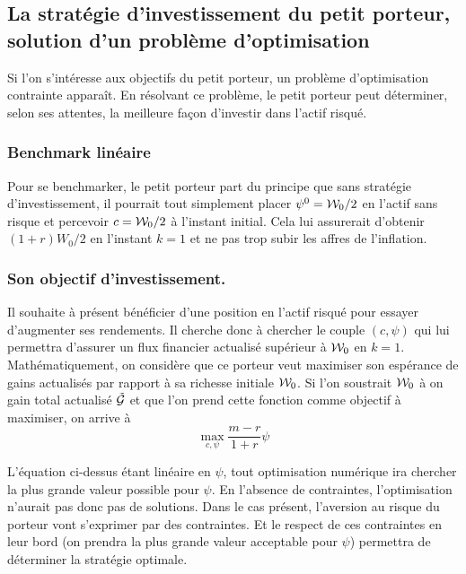 \documentclass{article}
\numberwithin{equation}{section}
\begin{document}
\subsection{La stratégie d'investissement du petit porteur, solution d'un problème d'optimisation}

Si l'on s'intéresse aux objectifs du petit porteur, un problème d'optimisation contrainte apparaît. En résolvant ce problème, le petit porteur peut déterminer, selon ses attentes, la meilleure façon d'investir dans l'actif risqué.

\subsubsection{Benchmark linéaire}

Pour se benchmarker, le petit porteur part du principe que sans stratégie d'investissement, il pourrait tout simplement placer $\psi^0 = \mathcal{W}_0/2$ en l'actif sans risque et percevoir $c = \mathcal{W}_0/2$ à l'instant initial. Cela lui assurerait d'obtenir $(1 + r)W_0/2$ en l'instant $k = 1$ et ne pas trop subir les affres de l'inflation.\\

\subsubsection{Son objectif d'investissement.}

Il souhaite à présent bénéficier d'une position en l'actif risqué pour essayer d'augmenter ses rendements. Il cherche donc à chercher le couple $(c, \psi)$ qui lui permettra d'assurer un flux financier actualisé supérieur à $\mathcal{W}_0$ en $k = 1$.\\

Mathématiquement, on considère que ce porteur veut maximiser son espérance de gains actualisés par rapport à sa richesse initiale $\mathcal{W}_0$. Si l'on soustrait $\mathcal{W}_0$ à on gain total actualisé $\tilde{\mathcal{G}}$ et que l'on prend cette fonction comme objectif à maximiser, on arrive à
\begin{equation}
\max_{c, \psi} \frac{m - r}{1 + r}\psi
\end{equation}

L'équation ci-dessus étant linéaire en $\psi$, tout optimisation numérique ira chercher la plus grande valeur possible pour $\psi$. En l'absence de contraintes, l'optimisation n'aurait pas donc pas de solutions. Dans le cas présent, l'aversion au risque du porteur vont s'exprimer par des contraintes. Et le respect de ces contraintes en leur bord (on prendra la plus grande valeur acceptable pour $\psi$) permettra de déterminer la stratégie optimale.
\end{document}
